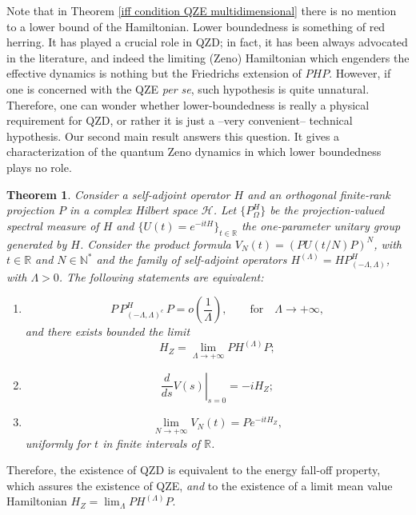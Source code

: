 \documentclass[aip,jmp
]{revtex4}
\newcommand{\RM}{\mathbb{R}}
\newcommand{\NM}{\mathbb{N}}
\newtheorem{theorem}{Theorem}
\theoremstyle{definition}
\begin{document}
Note that in Theorem \ref{iff condition QZE multidimensional} there is no mention to a lower bound of the Hamiltonian. Lower boundedness is something of red herring.
It has played a crucial role in QZD; in fact, it has been always advocated in the literature, and indeed the limiting (Zeno) Hamiltonian which engenders the effective dynamics is nothing but the Friedrichs extension of $PHP$.
However, if one is concerned with the QZE \textit{per se},
such hypothesis is quite unnatural. Therefore, one can wonder whether lower-boundedness is really a physical requirement for QZD, or rather it is just a --very convenient-- technical hypothesis. Our second main result answers this question. It gives a characterization of the quantum Zeno dynamics in which lower boundedness plays no role.

\begin{theorem}\label{thm:QZE}
Consider  a self-adjoint operator  $H$ and an orthogonal
finite-rank projection $P$ in a complex Hilbert space
$\mathcal{H}$. Let  $\{P_{\Omega}^H\}$ be the projection-valued
spectral measure  of $H$ and $\{U(t)=e^{-itH}\}_{t \in \RM}$ the
one-parameter unitary group generated by $H$. Consider the product
formula
$V_{N}(t)=(PU(t/N)P)^{N}$, with $t \in \RM$ and $N \in \NM^*$ and
 the family of self-adjoint operators $H^{(\Lambda)}=HP^{H}_{(-\Lambda,\Lambda)}$, with $\Lambda > 0$.
The following statements are equivalent:
\begin{enumerate}
    \item \label {thm:QZE_1}
    \begin{equation*}
     P\, P_{(-\Lambda,\Lambda)^c}^H\, P = o\left( \frac{1}{\Lambda} \right), \qquad \mathrm{for} \quad \Lambda \to + \infty,
    \end{equation*}
    and there exists bounded the limit
    $$H_Z=\lim_{\Lambda \to +\infty} PH^{(\Lambda)}P;$$
     \item
      \begin{equation*}
       \left.\frac{d}{ds}V(s)\right|_{s=0}=-iH_{Z};
      \end{equation*}
    \item
    \begin{equation*}
      \lim_{N \to +\infty} V_{N}(t)=Pe^{-itH_{Z}},
    \end{equation*}
    uniformly for $t$ in finite intervals of $\RM$.
\end{enumerate}
\end{theorem}

Therefore,  the existence of QZD is equivalent  to
the energy fall-off property, which assures the existence of QZE, \emph{and}
to the existence of a limit mean value Hamiltonian $H_Z = \lim_\Lambda P H^{(\Lambda)}P$.
\end{document}
